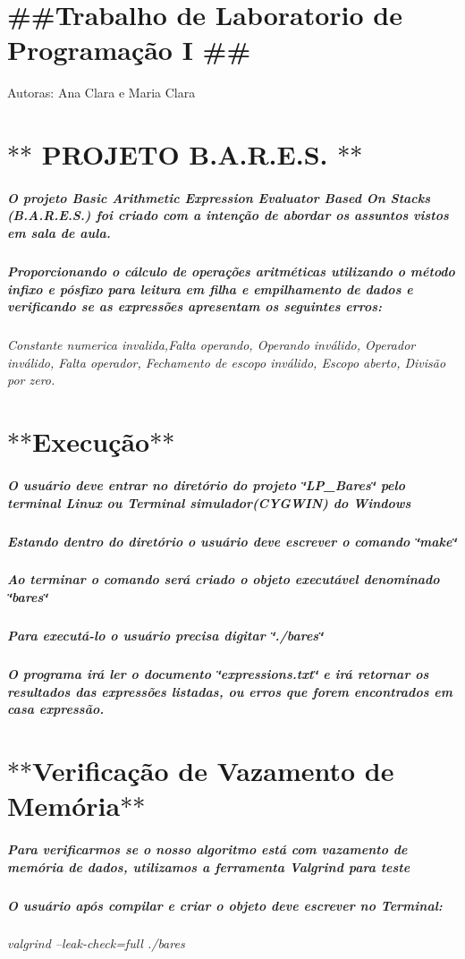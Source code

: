 \section*{\#\#\+Trabalho de Laboratorio de Programação I \#\#}

Autoras\+: Ana Clara e Maria Clara

\section*{$\ast$$\ast$ P\+R\+O\+J\+E\+T\+O B.\+A.\+R.\+E.\+S. $\ast$$\ast$}

\subparagraph*{O projeto Basic Arithmetic Expression Evaluator Based On Stacks (B.\+A.\+R.\+E.\+S.) foi criado com a intenção de abordar os assuntos vistos em sala de aula.}

\subparagraph*{Proporcionando o cálculo de operações aritméticas utilizando o método infixo e pósfixo para leitura em filha e empilhamento de dados e verificando se as expressões apresentam os seguintes erros\+:}

{\itshape Constante numerica invalida,Falta operando, Operando inválido, Operador inválido, Falta operador, Fechamento de escopo inválido, Escopo aberto, Divisão por zero.}

\section*{$\ast$$\ast$\+Execução$\ast$$\ast$}

\subparagraph*{O usuário deve entrar no diretório do projeto \char`\"{}\+L\+P\+\_\+\+Bares\char`\"{} pelo terminal Linux ou Terminal simulador(\+C\+Y\+G\+W\+I\+N) do Windows}

\subparagraph*{Estando dentro do diretório o usuário deve escrever o comando \char`\"{}make\char`\"{}}

\subparagraph*{Ao terminar o comando será criado o objeto executável denominado \char`\"{}bares\char`\"{}}

\subparagraph*{Para executá-\/lo o usuário precisa digitar \char`\"{}./bares\char`\"{}}

\subparagraph*{O programa irá ler o documento \char`\"{}expressions.\+txt\char`\"{} e irá retornar os resultados das expressões listadas, ou erros que forem encontrados em casa expressão.}

\section*{$\ast$$\ast$\+Verificação de Vazamento de Memória$\ast$$\ast$ }

\subparagraph*{Para verificarmos se o nosso algoritmo está com vazamento de memória de dados, utilizamos a ferramenta Valgrind para teste}

\subparagraph*{O usuário após compilar e criar o objeto deve escrever no Terminal\+:}

{\itshape valgrind --leak-\/check=full ./bares} 